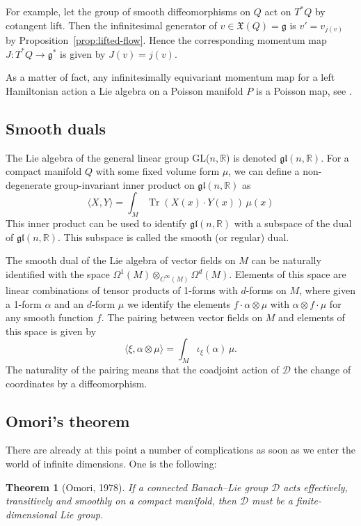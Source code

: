 \documentclass[a5paper,10pt,twoside]{article}
\newcommand{\R}{\ensuremath{\mathbb{R}}}
\newcommand{\cD}{\ensuremath{\mathcal{D}}}
\DeclareMathOperator*{\Tr}{Tr}
\theoremstyle{plain}
\newtheorem{teo}{Theorem}[section]
\theoremstyle{definition}
\theoremstyle{remark}
\begin{document}
For example, let the group of smooth diffeomorphisms on $Q$ act on $T^*Q$ by cotangent lift. Then the infinitesimal generator of $v\in\mathfrak{X}(Q)=\mathfrak{g}$ is $v'=v_{j(v)}$ by Proposition~\ref{prop:lifted-flow}. Hence the corresponding momentum map $J: T^*Q\to\mathfrak{g}^*$ is given by $J(v)=j(v)$.

As a matter of fact, any infinitesimally equivariant momentum map for a left Hamiltonian action a Lie algebra on a Poisson manifold $P$ is a Poisson map, see \cite{marsden1999mechanics}.


\subsection{Smooth duals}
The Lie algebra of the general linear group GL($n,\R$) is denoted $\mathfrak{gl}(n,\R)$. For a compact manifold $Q$ with some fixed volume form $\mu$, we can
define a non-degenerate group-invariant inner product on $\mathfrak{gl}(n,\R)$ as
%
\begin{equation}
 \langle X,Y\rangle = \int_M \Tr(X(x)\cdot Y(x))\,\mu(x)
\end{equation}
%
This inner product can be used to identify $\mathfrak{gl}(n,\R)$ with a subspace of the dual of $\mathfrak{gl}(n,\R)$. This subspace is called the smooth (or regular) dual.


The smooth dual of the Lie algebra of vector fields on $M$ can be naturally identified with the space $\Omega^1(M)\otimes_{C^\infty(M)}\Omega^d(M)$. Elements of this space are linear combinations of tensor products of 1-forms with $d$-forms on $M$, where given a 1-form $\alpha$ and an $d$-form $\mu$ we identify the elements $f\cdot\alpha\otimes\mu$ with $\alpha\otimes f\cdot\mu$ for any smooth function $f.$ The pairing between vector fields on $M$ and elements of this space is given by
%
\begin{equation}
\langle \xi,\alpha\otimes\mu\rangle =\int_M \iota_\xi(\alpha) \,\mu.
\end{equation}
%
The naturality of the pairing means that the coadjoint action of $\cD$ the change of coordinates by a diffeomorphism.

\subsection{Omori's theorem}
There are already at this point a number of complications as soon as we enter the world of infinite dimensions. One is the following:

\begin{teo}[Omori, 1978]
	If a connected Banach--Lie group $\cD$ acts effectively, transitively and smoothly on a compact manifold, then $\cD$ must be a finite-dimensional Lie group.
\end{teo}
\end{document}

